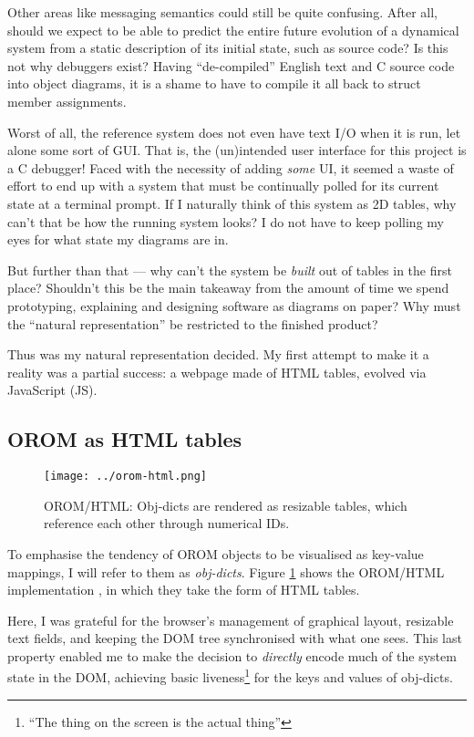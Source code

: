 Other areas like messaging semantics could still be quite confusing.
After all, should we expect to be able to predict the entire future
evolution of a dynamical system from a static description of its initial
state, such as source code? Is this not why debuggers exist? Having
``de-compiled'' English text and C source code into object diagrams, it
is a shame to have to compile it all back to struct member assignments.

Worst of all, the reference system does not even have text I/O when it
is run, let alone some sort of GUI. That is, the (un)intended user
interface for this project is a C debugger! Faced with the necessity of
adding \emph{some} UI, it seemed a waste of effort to end up with a
system that must be continually polled for its current state at a
terminal prompt. If I naturally think of this system as 2D tables, why
can't that be how the running system looks? I do not have to keep
polling my eyes for what state my diagrams are in.

But further than that --- why can't the system be \emph{built} out of
tables in the first place? Shouldn't this be the main takeaway from the
amount of time we spend prototyping, explaining and designing software
as diagrams on paper? Why must the ``natural representation'' be
restricted to the finished product?

Thus was my natural representation decided. My first attempt to make it
a reality was a partial success: a webpage made of HTML tables, evolved
via JavaScript (JS).

\hypertarget{orom-as-html-tables}{%
\subsection{OROM as HTML tables}\label{orom-as-html-tables}}

\begin{figure}[h]
  \centering
  \texttt{[image: ../orom-html.png]}
  \caption{OROM/HTML: Obj-dicts are rendered as resizable tables, which reference
           each other through numerical IDs. \label{fig:orom-html}}
\end{figure}

To emphasise the tendency of OROM objects to be visualised as key-value
mappings, I will refer to them as \emph{obj-dicts}. Figure
\ref{fig:orom-html} shows the OROM/HTML implementation \cite{orom-html},
in which they take the form of HTML tables.

Here, I was grateful for the browser's management of graphical layout,
resizable text fields, and keeping the DOM tree synchronised with what
one sees. This last property enabled me to make the decision to
\emph{directly} encode much of the system state in the DOM, achieving
basic liveness\footnote{``The thing on the screen is the actual thing''}
for the keys and values of obj-dicts.

